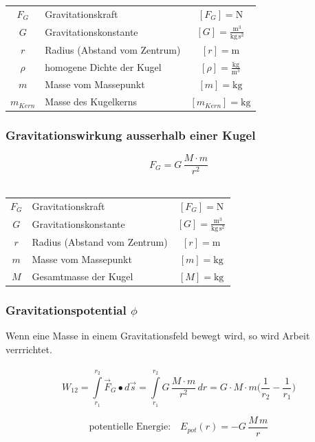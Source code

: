 			\begin{tabular}{c l c}
				$F_G$ & Gravitationskraft & $[F_G] = \mathrm{N}$ \\
				$G$ & Gravitationskonstante & $[G] = \mathrm{\frac{m^3}{kg \, s^2}}$ \\	
				$r$ & Radius (Abstand vom Zentrum) & $[r] = \mathrm{m}$ \\
				$\rho$ & homogene Dichte der Kugel & $[\rho] = \mathrm{\frac{kg}{m^3}}$ \\
				$m$ & Masse vom Massepunkt & $[m] = \mathrm{kg}$ \\
				$m_{Kern}$ & Masse des Kugelkerns & $[m_{Kern}] = \mathrm{kg}$ \\
			\end{tabular}

		\subsubsection{Gravitationswirkung ausserhalb einer Kugel}
		
			$$ \boxed{ F_G = G \, \frac{M \cdot m}{r^2}}  $$ \\
			
			\begin{tabular}{c l c}
				$F_G$ & Gravitationskraft & $[F_G] = \mathrm{N}$ \\
				$G$ & Gravitationskonstante & $[G] = \mathrm{\frac{m^3}{kg \, s^2}}$ \\	
				$r$ & Radius (Abstand vom Zentrum) & $[r] = \mathrm{m}$ \\
				$m$ & Masse vom Massepunkt & $[m] = \mathrm{kg}$ \\
				$M$ & Gesamtmasse der Kugel & $[M] = \mathrm{kg}$ \\
			\end{tabular}

		\subsubsection{Gravitationspotential  $\phi$}
		
			Wenn eine Masse in einem Gravitationsfeld bewegt wird, so wird Arbeit verrrichtet. \\
			\\
			$$ \boxed{ W_{12} = \int \limits_{r_1}^{r_2} \vec{F}_G \bullet d \vec{s}  =  \int \limits_{r_1}^{r_2} G \, \frac{M \cdot m}{r^2} \, dr = G \cdot M \cdot m \big( \frac{1}{r_2} - \frac{1}{r_1}  \big) }  $$  
			
			$$ \boxed{ \text{potentielle Energie:} \quad E_{pot}(r) = -G \, \frac{M \, m}{r} }$$ 
			
